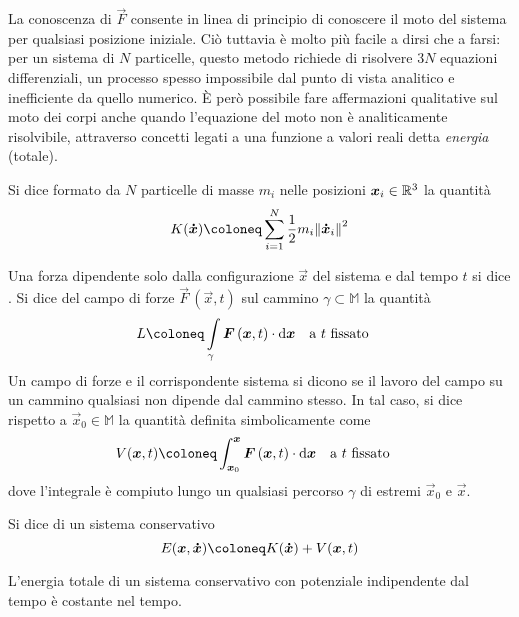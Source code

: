 La conoscenza di $\vec{F}$ consente in linea di principio di conoscere il moto del sistema per qualsiasi posizione iniziale. Ciò tuttavia è molto più facile a dirsi che a farsi: per un sistema di $N$ particelle, questo metodo richiede di risolvere $3N$ equazioni differenziali, un processo spesso impossibile dal punto di vista analitico e inefficiente da quello numerico. È però possibile fare affermazioni qualitative sul moto dei corpi anche quando l'equazione del moto non è analiticamente risolvibile, attraverso concetti legati a una funzione a valori reali detta \emph{energia} (totale).
\begin{definition}
  Si dice  formato da $N$ particelle di masse $m_i$ nelle posizioni $\boldsymbol{x}_i \in \mathbb{R}^3$ la quantità \begin{equation}
    K(\vec{\dot{x}}) \defeq \sum_{i=1}^{N} \frac{1}{2}m_i\norm{\vec{\dot{x}}_i}^2
  \end{equation} 
\end{definition}
\begin{definition}
  Una forza dipendente solo dalla configurazione $\vec{x}$ del sistema e dal tempo $t$ si dice . Si dice  del campo di forze $\vec{F}\, (\vec{x},t)$ sul cammino $\gamma \subset \mathbb{M}$ la quantità \begin{equation}
  L \defeq \int\limits_{\gamma} \vec{F}\,(\vec{x},t)\cdot \dd \vec{x} \qqtext{a $t$ fissato}
  \end{equation} 
  Un campo di forze e il corrispondente sistema si dicono  se il lavoro del campo su un cammino qualsiasi non dipende dal cammino stesso. In tal caso, si dice  rispetto a $\vec{x}_0 \in \mathbb{M}$ la quantità definita simbolicamente come \begin{equation}
  V(\vec{x},t) \defeq \int_{\vec{x}_0}^{\vec{x}} \vec{F}\,(\vec{x},t)\cdot \dd \vec{x} \qqtext{a $t$ fissato}
  \end{equation} 
  dove l'integrale è compiuto lungo un qualsiasi percorso $\gamma$ di estremi $\vec{x}_0$ e $\vec{x}$.
\end{definition}
\begin{definition}
  Si dice  di un sistema conservativo\begin{equation}
  E(\vec{x},\vec{\dot{x}}) \defeq K(\vec{\dot{x}}) + V(\vec{x},t)
  \end{equation} 
\end{definition}
\begin{theorem} \label{thm:energyCons}
L'energia totale di un sistema conservativo con potenziale indipendente dal tempo è costante nel tempo.
\end{theorem}

